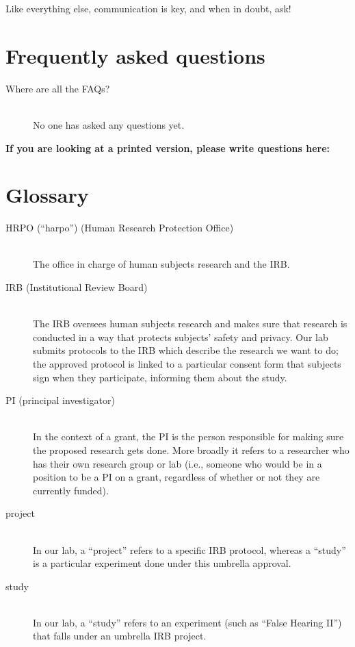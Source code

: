\documentclass[letterpaper,12pt,oneside]{memoir}
\begin{document}
Like everything else, communication is key, and when in doubt, ask!

\chapter{Frequently asked questions}

\begin{description}
\item[Where are all the FAQs?] \hfill \\
No one has asked any questions yet.


\end{description}

\vspace{.2in}
\noindent \textbf{\large If you are looking at a printed version, please write questions here:}


%

\chapter{Glossary}

\begin{description}

\item[HRPO (``harpo'') (Human Research Protection Office)] \hfill \\
The office in charge of human subjects research and the IRB.

\item[IRB (Institutional Review Board)] \hfill \\
The IRB oversees human subjects research and makes sure that research is conducted in a way that protects subjects' safety and privacy. Our lab submits protocols to the IRB which describe the research we want to do; the approved protocol is linked to a particular consent form that subjects sign when they participate, informing them about the study.

\item[PI (principal investigator)] \hfill \\
In the context of a grant, the PI is the person responsible for making sure the proposed research gets done. More broadly it refers to a researcher who has their own research group or lab (i.e., someone who would be in a position to be a PI on a grant, regardless of whether or not they are currently funded).

\item[project] \hfill \\
In our lab, a ``project'' refers to a specific IRB protocol, whereas a ``study'' is a particular experiment done under this umbrella approval.

\item[study] \hfill \\
In our lab, a ``study'' refers to an experiment (such as ``False Hearing II'') that falls under an umbrella IRB project.

\end{description}
\end{document}

